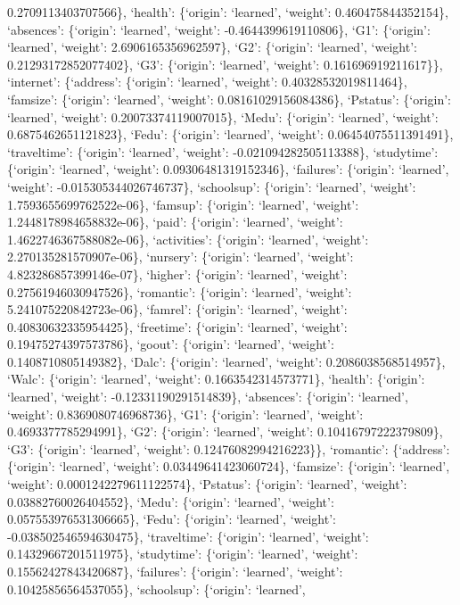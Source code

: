 \documentclass[
]{article}
\begin{document}
0.2709113403707566\}, `health': \{`origin': `learned', `weight':
0.460475844352154\}, `absences': \{`origin': `learned', `weight':
-0.4644399619110806\}, `G1': \{`origin': `learned', `weight':
2.6906165356962597\}, `G2': \{`origin': `learned', `weight':
0.21293172852077402\}, `G3': \{`origin': `learned', `weight':
0.161696919211617\}\}, `internet': \{`address': \{`origin': `learned',
`weight': 0.40328532019811464\}, `famsize': \{`origin': `learned',
`weight': 0.08161029156084386\}, `Pstatus': \{`origin': `learned',
`weight': 0.20073374119007015\}, `Medu': \{`origin': `learned',
`weight': 0.6875462651121823\}, `Fedu': \{`origin': `learned', `weight':
0.06454075511391491\}, `traveltime': \{`origin': `learned', `weight':
-0.021094282505113388\}, `studytime': \{`origin': `learned', `weight':
0.09306481319152346\}, `failures': \{`origin': `learned', `weight':
-0.015305344026746737\}, `schoolsup': \{`origin': `learned', `weight':
1.7593655699762522e-06\}, `famsup': \{`origin': `learned', `weight':
1.2448178984658832e-06\}, `paid': \{`origin': `learned', `weight':
1.4622746367588082e-06\}, `activities': \{`origin': `learned', `weight':
2.270135281570907e-06\}, `nursery': \{`origin': `learned', `weight':
4.823286857399146e-07\}, `higher': \{`origin': `learned', `weight':
0.27561946030947526\}, `romantic': \{`origin': `learned', `weight':
5.241075220842723e-06\}, `famrel': \{`origin': `learned', `weight':
0.40830632335954425\}, `freetime': \{`origin': `learned', `weight':
0.19475274397573786\}, `goout': \{`origin': `learned', `weight':
0.1408710805149382\}, `Dalc': \{`origin': `learned', `weight':
0.2086038568514957\}, `Walc': \{`origin': `learned', `weight':
0.1663542314573771\}, `health': \{`origin': `learned', `weight':
-0.12331190291514839\}, `absences': \{`origin': `learned', `weight':
0.8369080746968736\}, `G1': \{`origin': `learned', `weight':
0.4693377785294991\}, `G2': \{`origin': `learned', `weight':
0.10416797222379809\}, `G3': \{`origin': `learned', `weight':
0.12476082994216223\}\}, `romantic': \{`address': \{`origin': `learned',
`weight': 0.03449641423060724\}, `famsize': \{`origin': `learned',
`weight': 0.0001242279611122574\}, `Pstatus': \{`origin': `learned',
`weight': 0.03882760026404552\}, `Medu': \{`origin': `learned',
`weight': 0.057553976531306665\}, `Fedu': \{`origin': `learned',
`weight': -0.038502546594630475\}, `traveltime': \{`origin': `learned',
`weight': 0.14329667201511975\}, `studytime': \{`origin': `learned',
`weight': 0.15562427843420687\}, `failures': \{`origin': `learned',
`weight': 0.10425856564537055\}, `schoolsup': \{`origin': `learned',
\end{document}
